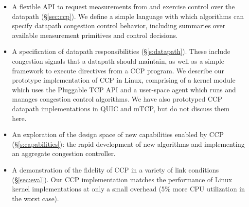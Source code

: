 \begin{itemize}
\item A flexible API to request measurements from and exercise control over the datapath (\S\ref{sec:ccp}). We define a simple language with which algorithms can specify datapath congestion control behavior, including summaries over available measurement primitives and control decisions.

\item A specification of datapath responsibilities (\S\ref{s:datapath}). These include congestion signals that a datapath should maintain, as well as a simple framework to execute directives from a CCP program.
We describe our prototype implementation of CCP in Linux, comprising of a kernel module which uses the Pluggable TCP API and a user-space agent which runs and manages congestion control algorithms.
We have also prototyped CCP datapath implementations in QUIC and mTCP, but do not discuss them here.

\item An exploration of the design space of new capabilities enabled by CCP (\S\ref{s:capabilities}): the rapid development of new algorithms and implementing an aggregate congestion controller.

\item A demonstration of the fidelity of CCP in a variety of link conditions (\S\ref{sec:eval}). Our CCP implementation matches the performance of Linux kernel implementations at only a small overhead (5\% more CPU utilization in the worst case).

\end{itemize}
\fi
